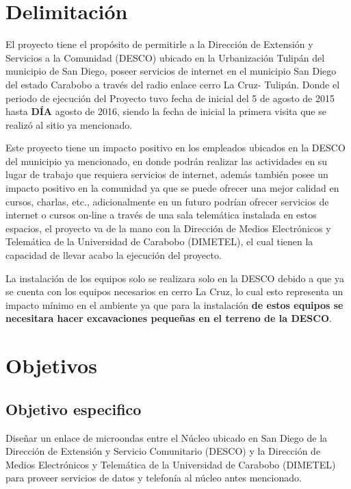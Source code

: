 \documentclass[11pt, a4paper, twosides]{report}
\begin{document}
\chapter{Delimitación}
El proyecto tiene  el propósito de permitirle a la Dirección de Extensión y  Servicios a la Comunidad (DESCO) ubicado en la Urbanización Tulipán del municipio de San Diego, poseer servicios de internet en el municipio San Diego del estado Carabobo a través del radio enlace  cerro La Cruz- Tulipán. Donde el periodo de ejecución del Proyecto tuvo fecha de inicial del 5 de agosto de 2015 hasta \textbf{DÍA} agosto de 2016, siendo la fecha de inicial la primera visita que se realizó al sitio ya mencionado. 

Este proyecto tiene un impacto positivo en los empleados  ubicados en la DESCO del municipio ya mencionado, en donde  podrán realizar las actividades en su lugar  de trabajo que requiera servicios de internet, además también posee un impacto positivo en la comunidad  ya que se puede ofrecer una  mejor calidad en cursos, charlas, etc., adicionalmente en un futuro podrían ofrecer servicios de internet o cursos on-line a través de una sala telemática instalada  en  estos espacios,  el proyecto va de la mano con la Dirección de Medios Electrónicos y Telemática de la Universidad de Carabobo (DIMETEL), el cual tienen la capacidad de llevar acabo la ejecución del proyecto. 

La instalación de los equipos solo se realizara solo en la DESCO debido a que ya se cuenta con los equipos necesarios en cerro La Cruz, lo cual esto representa un impacto mínimo  en el ambiente ya que para la instalación \textbf{de estos equipos se necesitara hacer excavaciones pequeñas en el terreno de la DESCO}. 


\chapter{Objetivos}

\section{Objetivo especifico}
Diseñar un enlace de microondas entre el Núcleo ubicado en San Diego de la Dirección de Extensión y Servicio Comunitario (DESCO) y la Dirección de Medios Electrónicos  y Telemática de la  Universidad de Carabobo (DIMETEL) para proveer servicios de datos y telefonía al núcleo antes mencionado. 
\end{document}
